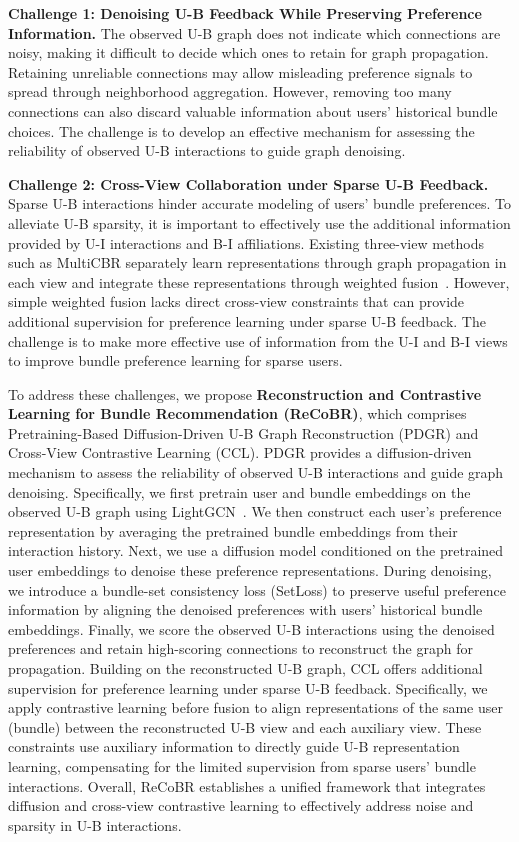 \documentclass[letterpaper]{article}
\begin{document}
\textbf{Challenge 1: Denoising U-B Feedback While Preserving Preference Information.} The observed U-B graph does not indicate which connections are noisy, making it difficult to decide which ones to retain for graph propagation. Retaining unreliable connections may allow misleading preference signals to spread through neighborhood aggregation. However, removing too many connections can also discard valuable information about users' historical bundle choices. The challenge is to develop an effective mechanism for assessing the reliability of observed U-B interactions to guide graph denoising.

\textbf{Challenge 2: Cross-View Collaboration under Sparse U-B Feedback.} Sparse U-B interactions hinder accurate modeling of users' bundle preferences. To alleviate U-B sparsity, it is important to effectively use the additional information provided by U-I interactions and B-I affiliations. Existing three-view methods such as MultiCBR separately learn representations through graph propagation in each view and integrate these representations through weighted fusion~\cite{ma2024multicbr}. However, simple weighted fusion lacks direct cross-view constraints that can provide additional supervision for preference learning under sparse U-B feedback. The challenge is to make more effective use of information from the U-I and B-I views to improve bundle preference learning for sparse users.

To address these challenges, we propose \textbf{Reconstruction and Contrastive Learning for Bundle Recommendation (ReCoBR)}, which comprises Pretraining-Based Diffusion-Driven U-B Graph Reconstruction (PDGR) and Cross-View Contrastive Learning (CCL). PDGR provides a diffusion-driven mechanism to assess the reliability of observed U-B interactions and guide graph denoising. Specifically, we first pretrain user and bundle embeddings on the observed U-B graph using LightGCN~\cite{he2020lightgcn}. We then construct each user's preference representation by averaging the pretrained bundle embeddings from their interaction history. Next, we use a diffusion model conditioned on the pretrained user embeddings to denoise these preference representations. During denoising, we introduce a bundle-set consistency loss (SetLoss) to preserve useful preference information by aligning the denoised preferences with users' historical bundle embeddings. Finally, we score the observed U-B interactions using the denoised preferences and retain high-scoring connections to reconstruct the graph for propagation. Building on the reconstructed U-B graph, CCL offers additional supervision for preference learning under sparse U-B feedback. Specifically, we apply contrastive learning before fusion to align representations of the same user (bundle) between the reconstructed U-B view and each auxiliary view. These constraints use auxiliary information to directly guide U-B representation learning, compensating for the limited supervision from sparse users' bundle interactions. Overall, ReCoBR establishes a unified framework that integrates diffusion and cross-view contrastive learning to effectively address noise and sparsity in U-B interactions.
\end{document}
